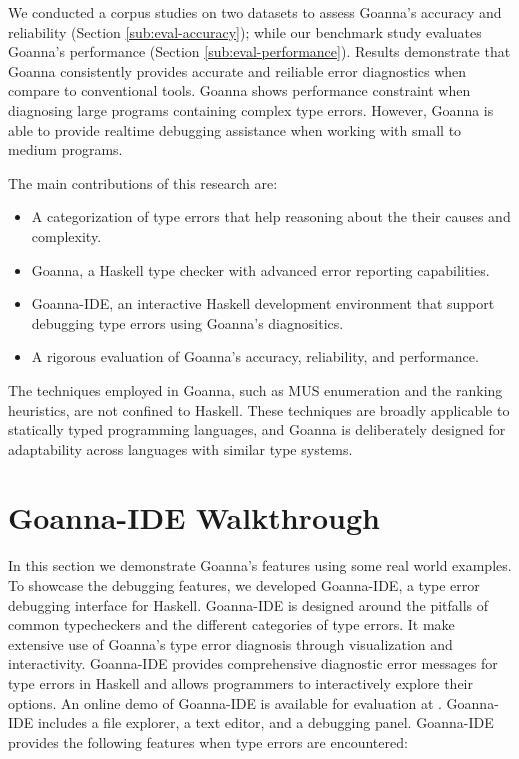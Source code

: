 \documentclass[pdflatex,sn-nature,Numbered]{sn-jnl}%
\begin{document}
We conducted a corpus studies on two datasets to assess Goanna's accuracy and reliability (Section \ref{sub:eval-accuracy}); while our benchmark study evaluates Goanna's performance (Section \ref{sub:eval-performance}). Results demonstrate that Goanna consistently provides accurate and reiliable error diagnostics when compare to conventional tools. Goanna shows performance constraint when diagnosing large programs containing complex type errors. However, Goanna is able to provide realtime debugging assistance when working with small to medium programs.

The main contributions of this research are:
\begin{itemize}
    \item A categorization of type errors that help reasoning about the their causes and complexity.
    \item Goanna, a Haskell type checker with advanced error reporting capabilities.
    \item Goanna-IDE, an interactive Haskell development environment that support debugging type errors using Goanna's diagnositics.
    \item A rigorous evaluation of Goanna's accuracy, reliability, and performance.
\end{itemize}

The techniques employed in Goanna, such as MUS enumeration and the ranking heuristics, are not confined to Haskell. These techniques are broadly applicable to statically typed programming languages, and Goanna is deliberately designed for adaptability across languages with similar type systems.

\section{Goanna-IDE Walkthrough} \label{walkthrough}
In this section we  demonstrate Goanna's features using some real world examples. To showcase the debugging features,  we developed Goanna-IDE, a type error debugging interface for Haskell. Goanna-IDE is designed around the pitfalls of common typecheckers and the different categories of type errors. It make extensive use of Goanna's type error diagnosis through visualization and interactivity. Goanna-IDE provides comprehensive diagnostic error messages for type errors in Haskell and allows programmers to interactively explore their options. An online demo of Goanna-IDE is available for evaluation at \cite{Fu2023-bo}. Goanna-IDE includes a file explorer, a text editor, and a debugging panel. Goanna-IDE provides the following features when type errors are encountered:
\end{document}
